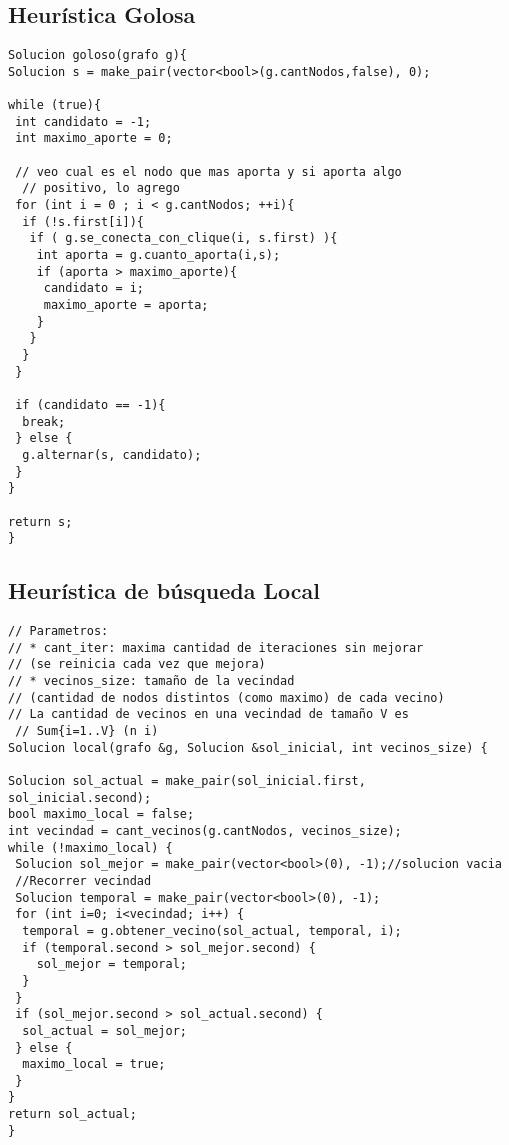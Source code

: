 \subsection{Heur\'istica Golosa}
\begin{lstlisting}
Solucion goloso(grafo g){
Solucion s = make_pair(vector<bool>(g.cantNodos,false), 0);

while (true){
 int candidato = -1;
 int maximo_aporte = 0;

 // veo cual es el nodo que mas aporta y si aporta algo
  // positivo, lo agrego
 for (int i = 0 ; i < g.cantNodos; ++i){				
  if (!s.first[i]){
   if ( g.se_conecta_con_clique(i, s.first) ){
    int aporta = g.cuanto_aporta(i,s);
    if (aporta > maximo_aporte){
     candidato = i;
     maximo_aporte = aporta;
    }
   }
  }
 }

 if (candidato == -1){
  break;
 } else {
  g.alternar(s, candidato);
 }
}

return s;
}

\end{lstlisting}
\newpage
\subsection{Heur\'istica de búsqueda Local}
\begin{lstlisting}
// Parametros:
// * cant_iter: maxima cantidad de iteraciones sin mejorar
// (se reinicia cada vez que mejora)
// * vecinos_size: tamaño de la vecindad
// (cantidad de nodos distintos (como maximo) de cada vecino)
// La cantidad de vecinos en una vecindad de tamaño V es
 // Sum{i=1..V} (n i)
Solucion local(grafo &g, Solucion &sol_inicial, int vecinos_size) {

Solucion sol_actual = make_pair(sol_inicial.first, sol_inicial.second);
bool maximo_local = false;
int vecindad = cant_vecinos(g.cantNodos, vecinos_size);
while (!maximo_local) {
 Solucion sol_mejor = make_pair(vector<bool>(0), -1);//solucion vacia
 //Recorrer vecindad
 Solucion temporal = make_pair(vector<bool>(0), -1);
 for (int i=0; i<vecindad; i++) {
  temporal = g.obtener_vecino(sol_actual, temporal, i);
  if (temporal.second > sol_mejor.second) {
    sol_mejor = temporal;
  }
 }
 if (sol_mejor.second > sol_actual.second) {
  sol_actual = sol_mejor;
 } else {
  maximo_local = true;
 }
}
return sol_actual;
}

\end{lstlisting}
\newpage
